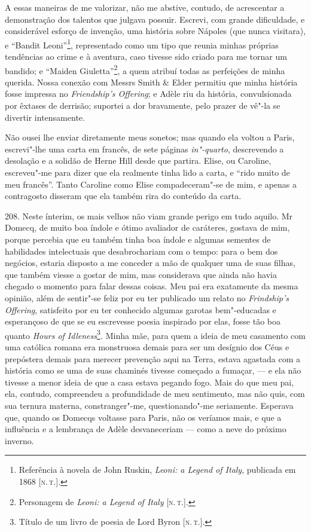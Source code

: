 A essas maneiras de me valorizar, não me abstive, contudo, de
acrescentar a demonstração dos talentos que julgava possuir. Escrevi,
com grande dificuldade, e considerável esforço de invenção, uma história
sobre Nápoles (que nunca visitara), e ``Bandit Leoni''\footnote{Referência
  à novela de John Ruskin, \emph{Leoni: a Legend of Italy}, publicada em
  1868 {[}\textsc{n.\,t.}{]}.}, representado como um tipo que reunia minhas
próprias tendências ao crime e à aventura, caso tivesse sido criado para
me tornar um bandido; e ``Maiden Giuletta''\footnote{Personagem de
  \emph{Leoni: a Legend of Italy} {[}\textsc{n.\,t.}{]}.}, a quem atribuí todas
as perfeições de minha querida. Nossa conexão com Messrs Smith \& Elder
permitiu que minha história fosse impressa no \emph{Friendship's
Offering}; e Adèle riu da história, convulsionada por êxtases de
derrisão; suportei a dor bravamente, pelo prazer de vê"-la se divertir
intensamente.

Não ousei lhe enviar diretamente meus sonetos; mas quando ela voltou a
Paris, escrevi"-lhe uma carta em francês, de sete páginas
\emph{in"-quarto}, descrevendo a desolação e a solidão de Herne Hill
desde que partira. Elise, ou Caroline, escreveu"-me para dizer que ela
realmente tinha lido a carta, e ``rido muito de meu francês''. Tanto
Caroline como Elise compadeceram"-se de mim, e apenas a contragosto
disseram que ela também rira do conteúdo da carta.

208. Neste ínterim, os mais velhos não viam grande perigo em tudo
aquilo. Mr Domecq, de muito boa índole e ótimo avaliador de caráteres,
gostava de mim, porque percebia que eu também tinha boa índole e algumas
sementes de habilidades intelectuais que desabrochariam com o tempo:
para o bem dos negócios, estaria disposto a me conceder a mão de
qualquer uma de suas filhas, que também viesse a gostar de mim, mas
considerava que ainda não havia chegado o momento para falar dessas
coisas. Meu pai era exatamente da mesma opinião, além de sentir"-se feliz
por eu ter publicado um relato no \emph{Frindship's Offering},
satisfeito por eu ter conhecido algumas garotas bem"-educadas e
esperançoso de que se eu escrevesse poesia inspirado por elas, fosse tão
boa quanto \emph{Hours of Idleness}\footnote{Título de um livro de
  poesia de Lord Byron {[}\textsc{n.\,t.}{]}.}\emph{.} Minha mãe, para quem a
ideia de meu casamento com uma católica romana era monstruosa demais
para ser um desígnio dos Céus e prepóstera demais para merecer prevenção
aqui na Terra, estava agastada com a história como se uma de suas
chaminés tivesse começado a fumaçar, --- e ela não tivesse a menor ideia
de que a casa estava pegando fogo. Mais do que meu pai, ela, contudo,
compreendeu a profundidade de meu sentimento, mas não quis, com sua
ternura materna, constranger"-me, questionando"-me seriamente. Esperava
que, quando os Domecqs voltasse para Paris, não os veríamos mais, e que
a influência e a lembrança de Adèle desvaneceriam --- como a neve do
próximo inverno.

